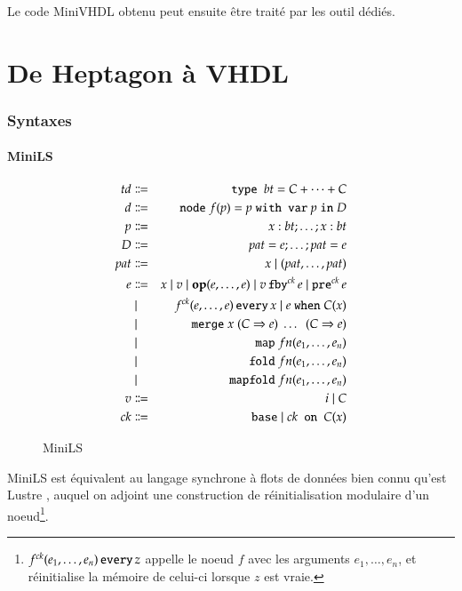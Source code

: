 \documentclass[9pt,a4paper]{article}
\newcommand{\TODO}[1]{}
\newcommand{\LANG}{Heptagon}
\newcommand{\p}[0]{\; \vert \;}
\newcommand{\mybox}[1]{\mbox{\tt{#1}}}
\newcommand{\Node}[4]{\mybox{node} \; f(#1) = #2 \; \mybox{with var} \
  #3 \; \mybox{in} \; #4}
\newcommand{\Op}[2]{\mybox{\bf{op}}(#1,\dots,#2)}
\newcommand{\Fby}[2]{#1 \, \mybox{fby}^{ck} \, #2}
\newcommand{\Pre}[1]{\mybox{pre}^{ck} \, #1}
\newcommand{\Every}[4]{#1^{ck}(#2,\dots,#3) \, \mybox{every} \, #4}
\newcommand{\When}[3]{#1 \; \mybox{when} \; #2(#3)}
\newcommand{\Merge}[5]{\mybox{merge} \; #1 \; (#2 \Rightarrow #3) \; \dots \; \
  (#4 \Rightarrow #5)}
\newcommand{\Base}[0]{\mybox{base}}
\newcommand{\On}[3]{#1 \mybox{ on } #2 (#3)}
\newcommand{\Map}[3]{\mathtt{map} \; #1 n (#2,\dots,#3)}
\newcommand{\Fold}[3]{\mathtt{fold} \; #1 n (#2,\dots,#3)}
\newcommand{\Mapfold}[3]{\mathtt{mapfold} \; #1 n (#2,\dots,#3)}
\begin{document}
Le code MiniVHDL obtenu peut ensuite être traité par les outil dédiés.

\section{De \LANG{} à VHDL}

\subsubsection{Syntaxes}

\TODO{Donner la forme originale sans reset telle qu'avant normalisation ?}

\paragraph{MiniLS}
\label{sec:syn:mls}

\begin{figure}[h]
  \centering
  \begin{eqnarray*}
    td & \Coloneqq & \mybox{type } bt = C + \dots + C \\
    d & \Coloneqq & \Node{p}{p}{p}{D} \\
    p & \Coloneqq & x : bt; \dots; x : bt \\
    D & \Coloneqq & pat = e; \dots; pat = e \\
    pat & \Coloneqq & x \p (pat,\dots,pat) \\
    e & \Coloneqq & x \p v \p \Op{e}{e} \p \Fby{v}{e} \p \Pre{e} \\
    & \p & \Every{f}{e}{e}{x} \p \When{e}{C}{x} \\
    & \p & \Merge{x}{C}{e}{C}{e} \\
    & \p & \Map{f}{e_1}{e_n} \\
    & \p & \Fold{f}{e_1}{e_n} \\
    & \p & \Mapfold{f}{e_1}{e_n} \\
    v & \Coloneqq & i \p C \\
    ck & \Coloneqq & \Base \p \On{ck}{C}{x}
  \end{eqnarray*}
  \caption{MiniLS}
  \label{fig:mls}
\end{figure}

MiniLS est équivalent au langage synchrone à flots de données bien connu qu'est
Lustre \cite{lustre}, auquel on adjoint une construction de réinitialisation
modulaire d'un noeud\footnote{$\Every{f}{e_1}{e_n}{z}$ appelle le noeud $f$ avec
  les arguments $e_1,\dots,e_n$, et réinitialise la mémoire de celui-ci lorsque
  $z$ est vraie.}.
\end{document}
